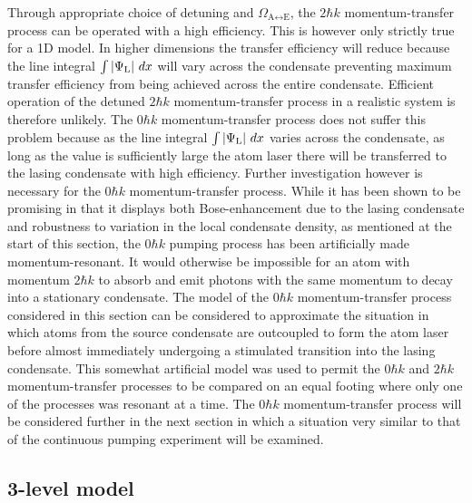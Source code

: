 Through appropriate choice of detuning and $\Omega_{\text{A} \leftrightarrow \text{E}}$, the $2 \hbar k$ momentum-transfer process can be operated with a high efficiency.  This is however only strictly true for a 1D model.  In higher dimensions the transfer efficiency will reduce because the line integral $\int \left|\Psi_\text{L}\right|\, dx$ will vary across the condensate preventing maximum transfer efficiency from being achieved across the entire condensate.  Efficient operation of the detuned $2 \hbar k$ momentum-transfer process in a realistic system is therefore unlikely.  The $0 \hbar k$ momentum-transfer process does not suffer this problem because as the line integral $\int \left|\Psi_\text{L}\right|\, dx$ varies across the condensate, as long as the value is sufficiently large the atom laser there will be transferred to the lasing condensate with high efficiency.  Further investigation however is necessary for the $0 \hbar k$ momentum-transfer process.  While it has been shown to be promising in that it displays both Bose-enhancement due to the lasing condensate and robustness to variation in the local condensate density, as mentioned at the start of this section, the $0 \hbar k$ pumping process has been artificially made momentum-resonant.  It would otherwise be impossible for an atom with momentum $2 \hbar k$ to absorb and emit photons with the same momentum to decay into a stationary condensate.  The model of the $0 \hbar k$ momentum-transfer process considered in this section can be considered to approximate the situation in which atoms from the source condensate are outcoupled to form the atom laser before almost immediately undergoing a stimulated transition into the lasing condensate.  This somewhat artificial model was used to permit the $0 \hbar k$ and $2\hbar k$ momentum-transfer processes to be compared on an equal footing where only one of the processes was resonant at a time.  The $0 \hbar k$ momentum-transfer process will be considered further in the next section in which a situation very similar to that of the continuous pumping experiment will be examined.

\subsection{3-level model}
\label{OpticalPumping:3LevelModel}

